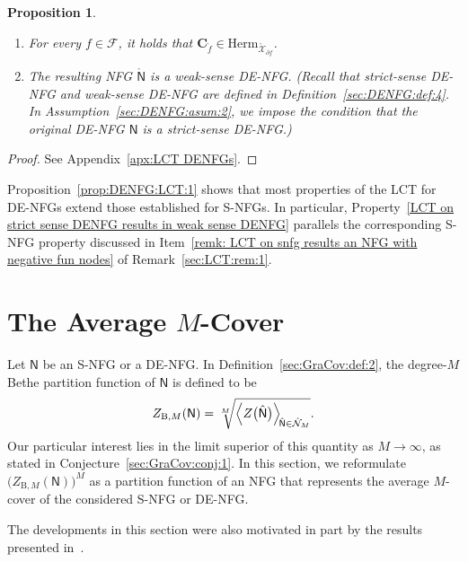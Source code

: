 \documentclass[journal]{IEEEtran}
\newcommand{\add}[1]{{\color{black}#1}}
\newtheorem{proposition}[theorem]{Proposition}
\newcommand{\vect}[1]{ \bm{#1} }
\newcommand{\set}[1]{\mathcal{#1}}
\newcommand{\setF}{ \mathcal{F} }
\newcommand{\sfN}{ \mathsf{N} }
\newcommand{\setpf}{ \partial f }
\newcommand{\graphN}{ \mathsf{N} }
\newcommand{\setHerm}[1]{ \mathrm{Herm}_{#1} }
\newcommand{\ZBM}{ Z_{\mathrm{B},M} }
\newcommand{\hgraphN}{ \hat{\graphN} }
\newcommand{\matr}[1]{\vect{#1}}
\newcommand{\LCTset}[1]{\mathring{\mathcal{#1}}}
\newcommand{\LCT}[1]{ \mathring{#1} }
\begin{document}
\begin{proposition}
\begin{enumerate}
    \item\label{prop:DENFG:LCT:1:item:9} \add{For every $f \in \setF$, it
            holds that
            $\matr{C}_{\LCT{f}} \in \setHerm{ \LCTset{X}_{\setpf} } $.}

    \item\label{LCT on strict sense DENFG results in weak sense DENFG}
          The resulting NFG $\LCT{\graphN}$ is a weak-sense DE-NFG.
          (Recall that strict-sense DE-NFG and
          weak-sense DE-NFG
          are defined in Definition~\ref{sec:DENFG:def:4}.
          In Assumption~\ref{sec:DENFG:asum:2}, we impose the condition that the original DE-NFG
          $ \sfN $ is a strict-sense DE-NFG.)

  \end{enumerate}

\end{proposition}

\begin{proof}
  See Appendix~\ref{apx:LCT DENFGs}.
\end{proof}

Proposition~\ref{prop:DENFG:LCT:1} shows that most properties of the LCT for DE-NFGs extend those established for S-NFGs. In particular, Property~\ref{LCT on strict sense DENFG results in weak sense DENFG} parallels the corresponding S-NFG property discussed in Item~\ref{remk: LCT on snfg results an NFG with negative fun nodes} of Remark~\ref{sec:LCT:rem:1}.

\section{The Average \texorpdfstring{$M$}{}-Cover}\label{sec:symmetric-subspace transform}
Let $\graphN$ be an S-NFG or a DE-NFG. In
Definition~\ref{sec:GraCov:def:2}, the degree-$M$ Bethe
partition function of $\graphN$ is defined to be
\begin{align*}
  \ZBM(\graphN)
  = \sqrt[M]{
      \Bigl\langle
      Z\bigl( \hgraphN \bigr)
      \Bigr\rangle_{ \! \hgraphN \in \hat{\set{N}}_{M}}
    }.
\end{align*}
Our
particular interest lies in the limit superior of this quantity as
$M \to \infty$, as stated in Conjecture~\ref{sec:GraCov:conj:1}. In this section, we reformulate
$\bigl( \ZBM(\graphN) \bigr)^{\!M}$ as a partition function of an NFG that represents the average $M$-cover of the considered S-NFG or DE-NFG.

The developments in this section were also motivated in part by the results presented in~\cite{Vontobel:16:1}.
\end{document}
